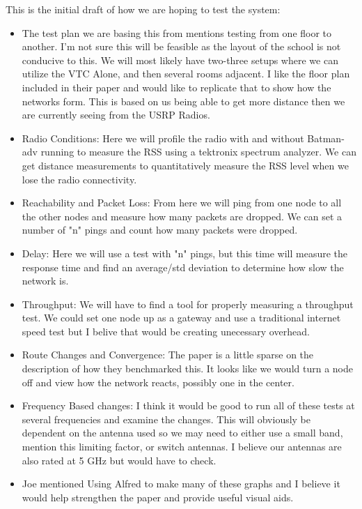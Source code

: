 \documentclass{article}
\begin{document}
{	This is the initial draft of how we are hoping to test the system:
	\begin{itemize}
		\item The test plan we are basing this from mentions testing from one floor to
			another. I'm not sure this will be feasible as the layout of the school is
			not conducive to this. We will most likely have two-three setups
			where we can utilize the VTC Alone, and then several rooms
			adjacent. I like the floor plan included in their paper and would
			like to replicate that to show how the networks form. This is based
			on us being able to get more distance then we are currently seeing from
			the USRP Radios. 
		\item Radio Conditions: Here we will profile the radio with and without Batman-adv
			running to measure the RSS using a tektronix spectrum analyzer. We can
			get distance measurements to quantitatively measure the RSS level when
			we lose the radio connectivity. 
		\item Reachability and Packet Loss: From here we will ping from one node to
			all the other nodes and measure how many packets are dropped. We
			can set a number of "n" pings and count how many packets were dropped.
		\item Delay: Here we will use a test with "n" pings, but this time will measure the
			response time and find an average/std deviation to determine how slow the
			network is. 
		\item Throughput: We will have to find a tool for properly measuring a throughput
			test. We could set one node up as a gateway and use a traditional internet
			speed test but I belive that would be creating unecessary overhead. 
		\item Route Changes and Convergence: The paper is a little sparse on the description
			of how they benchmarked this. It looks like we would turn a node off and
			view how the network reacts, possibly one in the center.
		\item Frequency Based changes: I think it would be good to run all of these tests
			at several frequencies and examine the changes. This will obviously
			be dependent on the antenna used so we may need to either use
			a small band, mention this limiting factor, or switch antennas. I
			believe our antennas are also rated at 5 GHz but would have to check.
		\item Joe mentioned Using Alfred to make many of these graphs and I believe it would
			help strengthen the paper and provide useful visual aids.

\end{itemize}}
\end{document}

